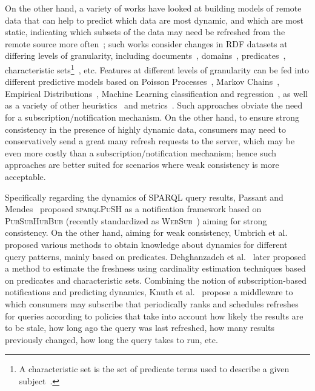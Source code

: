 \documentclass[runningheads]{llncs}
\begin{document}
On the other hand, a variety of works have looked at building models of remote data that can help to predict which data are most dynamic, and which are most static, indicating which subsets of the data may need be refreshed from the remote source more often~\cite{PassantM10,TrampFEA10,UmbrichHHPD10,UmbrichKL10,KaferAUOH13,DividinoSGG13,NishiokaS16,GonzalezH18}; such works consider changes in RDF datasets at differing levels of granularity, including documents~\cite{KaferAUOH13}, domains~\cite{KaferAUOH13,NishiokaS16,NishiokaS17}, predicates~\cite{KaferAUOH13,NishiokaS17}, characteristic sets\footnote{A characteristic set is the set of predicate terms used to describe a given subject~\cite{NeumannM11}.}~\cite{NishiokaS16,GonzalezH18}, etc. Features at different levels of granularity can be fed into different predictive models based on Poisson Processes~\cite{UmbrichHHPD10}, Markov Chains~\cite{UmbrichMP15}, Empirical Distributions~\cite{NeumaierU16}, Machine Learning classification and regression~\cite{NishiokaS17,GonzalezH18}, as well as a variety of other heuristics~\cite{AliciAOCU12,UmbrichMP15,KnuthHS16} and metrics~\cite{DividinoGS15,KnuthHS16,AkhtarAL17}. Such approaches obviate the need for a subscription/notification mechanism. On the other hand, to ensure strong consistency in the presence of highly dynamic data, consumers may need to conservatively send a great many refresh requests to the server, which may be even more costly than a subscription/notification mechanism; hence such approaches are better suited for scenarios where weak consistency is more acceptable.


%  

Specifically regarding the dynamics of SPARQL query results, Passant and Mendes~\cite{PassantM10} proposed \textsc{sparqlPuSH} as a notification framework based  on \textsc{PubSubHubBub} (recently standardized as \textsc{WebSub}~\cite{webSub18}) aiming for strong consistency. On the other hand, aiming for weak consistency, Umbrich et al.~\cite{UmbrichKHP12,UmbrichKPPH12,ekawUmbrichKHP12} proposed various methods to obtain knowledge about dynamics for different query patterns, mainly based on predicates. Dehghanzadeh et al.~\cite{DehghanzadehPKUHD14} later proposed a method to estimate the freshness using cardinality estimation techniques based on predicates and characteristic sets. Combining the notion of subscription-based notifications and predicting dynamics, Knuth et al.~\cite{KnuthHS16} propose a middleware to which consumers may subscribe that periodically ranks and schedules refreshes for queries according to policies that take into account how likely the results are to be stale, how long ago the query was last refreshed, how many results previously changed, how long the query takes to run, etc. 
\end{document}
